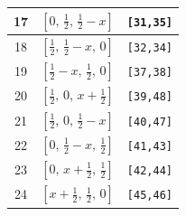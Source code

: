 \documentclass[fleqn,8pt]{jsarticle}
\begin{document}
\begin{longtable}{ccc}
17 & $\left[ 0,\, \frac{1}{2},\, \frac{1}{2} - x \right]$ & {\tt [31,35]} \\ \hline
18 & $\left[ \frac{1}{2},\, \frac{1}{2} - x,\, 0 \right]$ & {\tt [32,34]} \\ \hline
19 & $\left[ \frac{1}{2} - x,\, \frac{1}{2},\, 0 \right]$ & {\tt [37,38]} \\ \hline
20 & $\left[ \frac{1}{2},\, 0,\, x + \frac{1}{2} \right]$ & {\tt [39,48]} \\ \hline
21 & $\left[ \frac{1}{2},\, 0,\, \frac{1}{2} - x \right]$ & {\tt [40,47]} \\ \hline
22 & $\left[ 0,\, \frac{1}{2} - x,\, \frac{1}{2} \right]$ & {\tt [41,43]} \\ \hline
23 & $\left[ 0,\, x + \frac{1}{2},\, \frac{1}{2} \right]$ & {\tt [42,44]} \\ \hline
24 & $\left[ x + \frac{1}{2},\, \frac{1}{2},\, 0 \right]$ & {\tt [45,46]} \\
\end{longtable}
\renewcommand{\arraystretch}{1.2}
\end{document}
